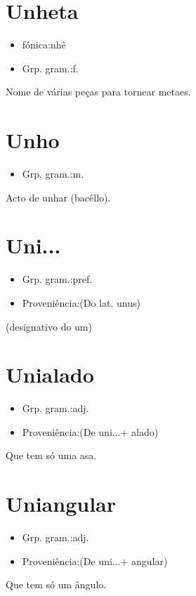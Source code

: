 \documentclass{article}
\begin{document}
\section{Unheta}
\begin{itemize}
\item {fónica:nhê}
\end{itemize}
\begin{itemize}
\item {Grp. gram.:f.}
\end{itemize}
Nome de várias peças para tornear metaes.
\section{Unho}
\begin{itemize}
\item {Grp. gram.:m.}
\end{itemize}
Acto de unhar (bacêllo).
\section{Uni...}
\begin{itemize}
\item {Grp. gram.:pref.}
\end{itemize}
\begin{itemize}
\item {Proveniência:(Do lat. \textunderscore unus\textunderscore )}
\end{itemize}
(designativo do \textunderscore um\textunderscore )
\section{Unialado}
\begin{itemize}
\item {Grp. gram.:adj.}
\end{itemize}
\begin{itemize}
\item {Proveniência:(De \textunderscore uni...\textunderscore  + \textunderscore alado\textunderscore )}
\end{itemize}
Que tem só uma asa.
\section{Uniangular}
\begin{itemize}
\item {Grp. gram.:adj.}
\end{itemize}
\begin{itemize}
\item {Proveniência:(De \textunderscore uni...\textunderscore  + \textunderscore angular\textunderscore )}
\end{itemize}
Que tem só um ângulo.
\end{document}
